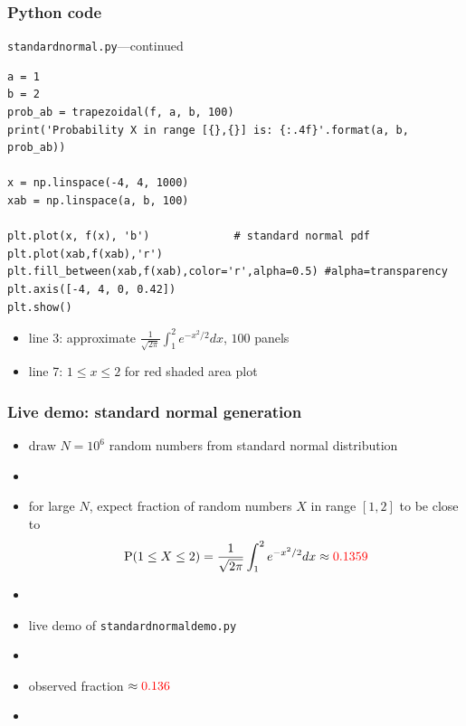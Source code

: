 \documentclass[english,14pt]{beamer}
\newcommand\red[1]{{\color{red} #1}}
\begin{document}

\begin{frame}[fragile]

\frametitle{Python code}

\texttt{standardnormal.py}---continued
\begin{lstlisting}[style=CStyle,basicstyle=\scriptsize]
a = 1
b = 2
prob_ab = trapezoidal(f, a, b, 100)
print('Probability X in range [{},{}] is: {:.4f}'.format(a, b, prob_ab))

x = np.linspace(-4, 4, 1000)
xab = np.linspace(a, b, 100)

plt.plot(x, f(x), 'b')             # standard normal pdf
plt.plot(xab,f(xab),'r')
plt.fill_between(xab,f(xab),color='r',alpha=0.5) #alpha=transparency
plt.axis([-4, 4, 0, 0.42])
plt.show()
\end{lstlisting}

\begin{itemize}
	\item line 3: approximate $\frac{1}{\sqrt{2\pi}} \int_1^2 e^{-x^2/2} dx$, $100$ panels
	\item line 7: $1 \leq x \leq 2$ for red shaded area plot
\end{itemize}

\end{frame}


\begin{frame}[fragile]

\frametitle{Live demo: standard normal generation}

\begin{itemize}
	\item draw $N = 10^6$ random numbers from standard normal distribution
	\item[]
	\item for large $N$, expect fraction of random numbers $X$ in range $[1,2]$ to be close to
	\[
	\mathrm{P}(1 \leq X \leq 2)  = \frac{1}{\sqrt{2\pi}} \int_1^2 e^{-x^2/2} dx \approx \red{0.1359}
	\]
	\item[]
	\item live demo of \texttt{standardnormaldemo.py}
	\item[]
	\item observed fraction $\approx \red{0.136}$
	\item[]
\end{itemize}

\end{frame}
\end{document}
